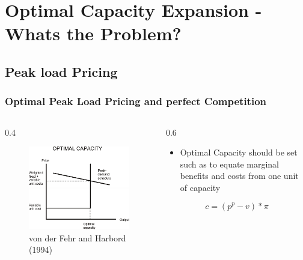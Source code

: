 \section{Optimal Capacity Expansion - Whats the Problem?}

\subsection{Peak load Pricing}

\begin{frame}
					
\frametitle{Optimal Peak Load Pricing and perfect Competition}
\begin{columns}
\begin{column} {0.4\textwidth}

\begin{figure}[h]
\centering
\includegraphics[width=1.\textwidth]{capacity/peak_load_opt}
    \caption{von der Fehr and Harbord (1994)}
    \label{fig:Daten 2004}            
\end{figure}
\end{column}

\begin{column} {0.6\textwidth}
\begin{itemize}
\item Optimal Capacity should be set such as to equate marginal benefits and costs from one unit of capacity
\end{itemize}

\begin{equation}
	c=(p^p-v)*\pi
\end{equation}


\end{column}
\end{columns}
\end{frame}
